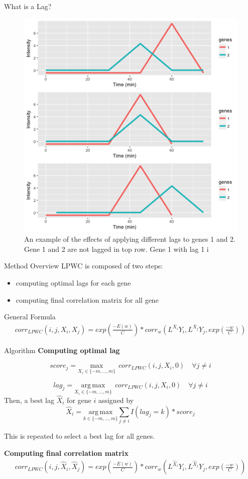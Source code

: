 \documentclass[10pt]{beamer}
\begin{document}
\begin{frame}{What is a Lag?}
\begin{figure}
     \includegraphics[width=0.60\linewidth]{Lags.png}
      \caption{An example of the effects of applying different lags to genes 1 and 2.  Gene 1 and 2 are not lagged in top row. Gene 1 with lag 1 i }
       \label{fig:lags}
    \end{figure}

\end{frame}


\begin{frame}{Method Overview}
LPWC is composed of two steps:
\begin{itemize}
\item computing optimal lags for each gene
\item computing final correlation matrix for all gene
\end{itemize}

General Formula
\begin{multline*}
corr_{LPWC}(i, j, X_i, X_j) = exp(\frac{- E(w)}{C})  * 
corr_w(L^{X_i}Y_i, L^{X_j}Y_j, exp(\frac{- w}{C}))
\end{multline*}
\end{frame}

\begin{frame}{Algorithm}
\textbf{Computing optimal lag}

$$score_{j} = \underset{X_i \in \{-m,..., m\}}{\mathrm{max}} \;\, corr_{LPWC}(i, j, X_i, 0) \quad \forall j \neq i$$

$$lag_{j} = \underset{X_i \in \{-m,..., m\}}{\mathrm{arg \,max}} \;\, corr_{LPWC}(i, j, X_i, 0) \quad \forall j \neq i$$
Then, a best lag $\hat{X}_i$ for gene $i$ assigned by 
\[
\hat{X}_i = \underset{k \in \{-m, ..., m\}}{\mathrm{arg \,max}} \sum_{j \neq i} I(lag_j = k) * score_j
\]

This is repeated to select a best lag for all genes.

\textbf{Computing final correlation matrix}
\begin{multline*}
 corr_{LPWC}(i, j, \hat{X}_i, \hat{X}_j) = 
exp(\frac{- E(w)}{C}) * corr_w(L^{\hat{X}_i}Y_i, L^{\hat{X}_j}Y_j, exp(\frac{- w}{C}))
\end{multline*}
\end{frame}
\end{document}
